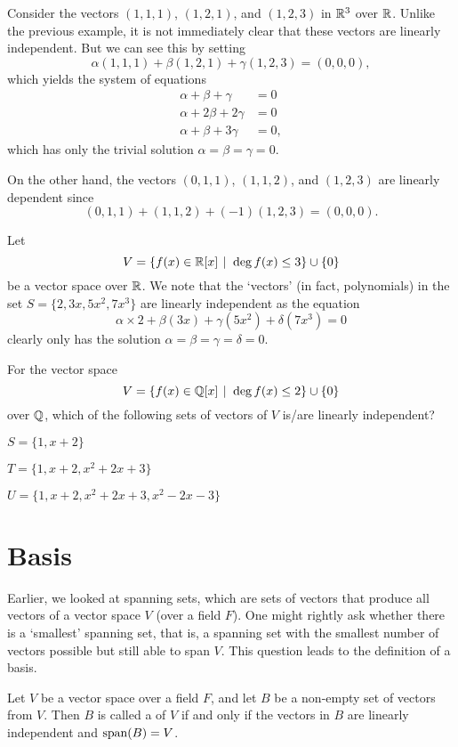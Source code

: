 \begin{example}
    Consider the vectors $(1, 1, 1)$, $(1, 2, 1)$, and $(1, 2, 3)$ in $\mathbb{R}^3$ over $\mathbb{R}$. Unlike the previous example, it is not immediately clear that these vectors are linearly independent. But we can see this by setting
    \[
        \alpha(1, 1, 1) + \beta(1, 2, 1) + \gamma(1, 2, 3) = (0, 0, 0),
    \]
    which yields the system of equations
    \begin{align*}
        \alpha + \beta + \gamma &= 0\\
        \alpha + 2\beta + 2\gamma &= 0\\
        \alpha + \beta + 3\gamma &= 0,
    \end{align*}
    which has only the trivial solution $\alpha = \beta = \gamma = 0$.

    On the other hand, the vectors $(0, 1, 1)$, $(1, 1, 2)$, and $(1, 2, 3)$ are linearly dependent since
    \[
        (0, 1, 1) + (1, 1, 2) + (-1)(1, 2, 3) = (0, 0, 0).
    \]
\end{example}

\begin{example}
    Let
    \[
        V = \{f(x) \in \R[x] \vert \deg f(x) \leq 3\} \cup \{0\}
    \]
    be a vector space over $\mathbb{R}$. We note that the `vectors' (in fact, polynomials) in the set $S = \{2, 3x, 5x^2, 7x^3\}$ are linearly independent as the equation
    \[
        \alpha\times2 + \beta(3x) + \gamma(5x^2) + \delta(7x^3) = 0
    \]
    clearly only has the solution $\alpha = \beta = \gamma = \delta = 0$.
\end{example}

\begin{exercise}\label{exercise-polynomial-of-degree-at-most-2-vector-space}
    For the vector space
    \[
        V = \{f(x) \in \Q[x] \vert \deg f(x) \leq 2\} \cup \{0\}
    \]
    over $\mathbb{Q}$, which of the following sets of vectors of $V$ is/are linearly independent?
    \begin{partquestions}{\alph*}
        \item $S = \{1, x + 2\}$
        \item $T = \{1, x + 2, x^2 + 2x + 3\}$
        \item $U = \{1, x + 2, x^2 + 2x + 3, x^2 - 2x - 3\}$
    \end{partquestions}
\end{exercise}

\section{Basis}
Earlier, we looked at spanning sets, which are sets of vectors that produce all vectors of a vector space $V$ (over a field $F$). One might rightly ask whether there is a `smallest' spanning set, that is, a spanning set with the smallest number of vectors possible but still able to span $V$. This question leads to the definition of a basis.
\begin{definition}
    Let $V$ be a vector space over a field $F$, and let $B$ be a non-empty set of vectors from $V$. Then $B$ is called a  of $V$ if and only if the vectors in $B$ are linearly independent and $\mathrm{span}(B) = V$.
\end{definition}

